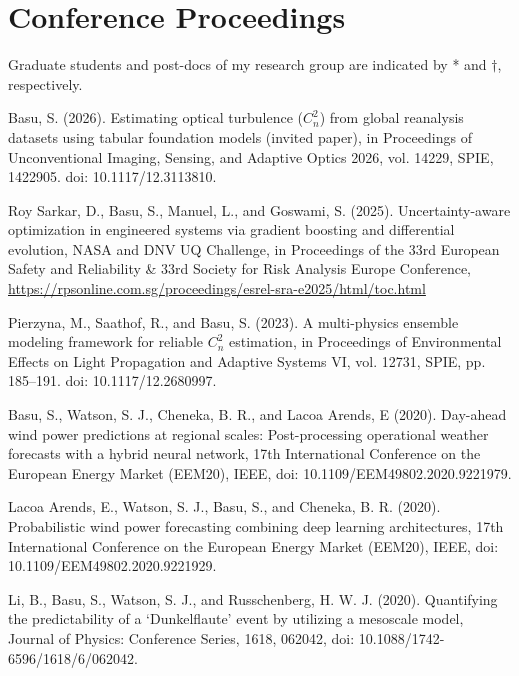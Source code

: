 \section*{Conference Proceedings}
Graduate students and post-docs of my research group are indicated by * and $\dagger$, respectively.\\ 

\normalsize

\begin{etaremune}[topsep=0pt,itemsep=0pt,partopsep=0pt,parsep=0pt]

\item Basu, S. (2026). Estimating optical turbulence ($C_n^2$) from global reanalysis datasets using tabular foundation models (invited paper), in Proceedings of Unconventional Imaging, Sensing, and Adaptive Optics 2026, vol. 14229, SPIE, 1422905. doi: 10.1117/12.3113810.

\item Roy Sarkar, D., Basu, S., Manuel, L., and Goswami, S. (2025). Uncertainty-aware optimization in engineered systems via gradient boosting and differential evolution, NASA and DNV UQ Challenge, in Proceedings of the 33rd European Safety and Reliability \& 33rd Society for Risk Analysis Europe Conference, \url{https://rpsonline.com.sg/proceedings/esrel-sra-e2025/html/toc.html}

\item Pierzyna, M., Saathof, R., and Basu, S. (2023). A multi-physics ensemble modeling framework for reliable $C_n^2$ estimation, in Proceedings of Environmental Effects on Light Propagation and Adaptive Systems VI, vol. 12731, SPIE, pp. 185–191. doi: 10.1117/12.2680997.

\item Basu, S., Watson, S. J., Cheneka, B. R., and Lacoa Arends, E (2020). Day-ahead wind power predictions at regional scales: Post-processing operational weather forecasts with a hybrid neural network, 17th International Conference on the European Energy Market (EEM20), IEEE, doi: 10.1109/EEM49802.2020.9221979.

\item Lacoa Arends, E., Watson, S. J., Basu, S., and Cheneka, B. R. (2020). Probabilistic wind power forecasting combining deep learning architectures, 17th International Conference on the European Energy Market (EEM20), IEEE, doi: 10.1109/EEM49802.2020.9221929.

\item Li, B., Basu, S., Watson, S. J., and Russchenberg, H. W. J. (2020). Quantifying the predictability of a `Dunkelflaute' event by utilizing a mesoscale model, Journal of Physics: Conference Series, 1618, 062042, doi: 10.1088/1742-6596/1618/6/062042.


\end{etaremune}
